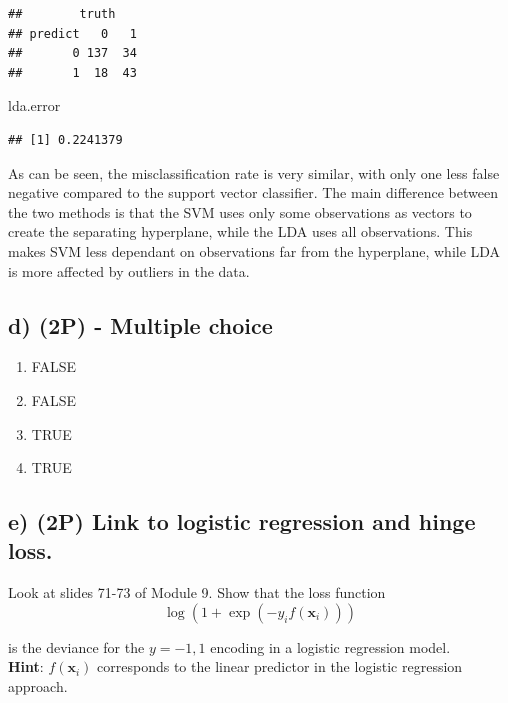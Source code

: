 \documentclass[]{article}
\newenvironment{Shaded}{\begin{snugshade}}{\end{snugshade}}
\newcommand{\NormalTok}[1]{#1}
\providecommand{\tightlist}{%
  \setlength{\itemsep}{0pt}\setlength{\parskip}{0pt}}
\begin{document}
\begin{verbatim}
##        truth
## predict   0   1
##       0 137  34
##       1  18  43
\end{verbatim}

\begin{Shaded}
\begin{Highlighting}[]
\NormalTok{lda.error}
\end{Highlighting}
\end{Shaded}

\begin{verbatim}
## [1] 0.2241379
\end{verbatim}

As can be seen, the misclassification rate is very similar, with only
one less false negative compared to the support vector classifier. The
main difference between the two methods is that the SVM uses only some
observations as vectors to create the separating hyperplane, while the
LDA uses all observations. This makes SVM less dependant on observations
far from the hyperplane, while LDA is more affected by outliers in the
data.

\hypertarget{d-2p---multiple-choice}{%
\subsection{d) (2P) - Multiple choice}\label{d-2p---multiple-choice}}

\begin{enumerate}
\def\labelenumi{(\roman{enumi})}
\tightlist
\item
  FALSE
\item
  FALSE
\item
  TRUE
\item
  TRUE
\end{enumerate}

\hypertarget{e-2p-link-to-logistic-regression-and-hinge-loss.}{%
\subsection{e) (2P) Link to logistic regression and hinge
loss.}\label{e-2p-link-to-logistic-regression-and-hinge-loss.}}

Look at slides 71-73 of Module 9. Show that the loss function
\[ \log(1+\exp(-y_i f({\boldsymbol x}_i)))\]

is the deviance for the \(y=-1,1\) encoding in a logistic regression
model.\\
\textbf{Hint}: \(f({\boldsymbol x}_i)\) corresponds to the linear
predictor in the logistic regression approach.
\end{document}
